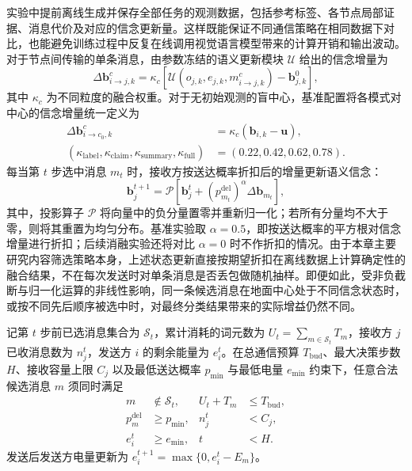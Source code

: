 实验中提前离线生成并保存全部任务的观测数据，包括参考标签、各节点局部证据、消息代价及对应的信念更新量。这样既能保证不同通信策略在相同数据下对比，也能避免训练过程中反复在线调用视觉语言模型带来的计算开销和输出波动。对于节点间传输的单条消息，由参数冻结的语义更新模块 $\mathcal U$ 给出的信念增量为
\begin{equation}
\Delta\bm b_{i\to j,k}^{c}
=\kappa_c\left[\mathcal U(o_{j,k},e_{j,k},m_{i\to j,k}^{c})-\bm b_{j,k}^{0}\right],
\label{rq2:eq:raw_update}
\end{equation}
其中 $\kappa_c$ 为不同粒度的融合权重。对于无初始观测的盲中心，基准配置将各模式对中心的信念增量统一定义为
\begin{equation}
\begin{aligned}
\Delta\bm b_{i\to c_0,k}^{c}&=\kappa_c(\bm b_{i,k}-\bm u),\\
(\kappa_{\mathrm{label}},\kappa_{\mathrm{claim}},\kappa_{\mathrm{summary}},\kappa_{\mathrm{full}})
&=(0.22,0.42,0.62,0.78).
\end{aligned}
\label{rq2:eq:center_update}
\end{equation}
每当第 $t$ 步选中消息 $m_t$ 时，接收方按送达概率折扣后的增量更新语义信念：
\begin{equation}
\bm b_j^{t+1}=\mathcal P\!\left[\bm b_j^t+
\left(p_{m_t}^{\mathrm{del}}\right)^\alpha\Delta\bm b_{m_t}\right],
\label{rq2:eq:belief_update}
\end{equation}
其中，投影算子 $\mathcal P$ 将向量中的负分量置零并重新归一化；若所有分量均不大于零，则将其重置为均匀分布。基准实验取 $\alpha=0.5$，即按送达概率的平方根对信念增量进行折扣；后续消融实验还将对比 $\alpha=0$ 时不作折扣的情况。由于本章主要研究内容筛选策略本身，上述状态更新直接按期望折扣在离线数据上计算确定性的融合结果，不在每次发送时对单条消息是否丢包做随机抽样。即便如此，受非负截断与归一化运算的非线性影响，同一条候选消息在地面中心处于不同信念状态时，或按不同先后顺序被选中时，对最终分类结果带来的实际增益仍然不同。

\begin{figure}[htbp]
\centering

\label{rq2:fig:workflow}
\end{figure}

记第 $t$ 步前已选消息集合为 $\mathcal S_t$，累计消耗的词元数为 $U_t=\sum_{m\in\mathcal S_t}T_m$，接收方 $j$ 已收消息数为 $n_j^t$，发送方 $i$ 的剩余能量为 $e_i^t$。在总通信预算 $T_{\mathrm{bud}}$、最大决策步数 $H$、接收容量上限 $C_j$ 以及最低送达概率 $p_{\min}$ 与最低电量 $e_{\min}$ 约束下，任意合法候选消息 $m$ 须同时满足
\begin{equation}
\begin{aligned}
m&\notin\mathcal S_t, & U_t+T_m&\leq T_{\mathrm{bud}},\\
p_m^{\mathrm{del}}&\geq p_{\min}, & n_j^t&<C_j,\\
e_i^t&\geq e_{\min}, & t&<H.
\end{aligned}
\label{rq2:eq:constraints}
\end{equation}
发送后发送方电量更新为 $e_i^{t+1}=\max\{0,e_i^t-E_m\}$。

